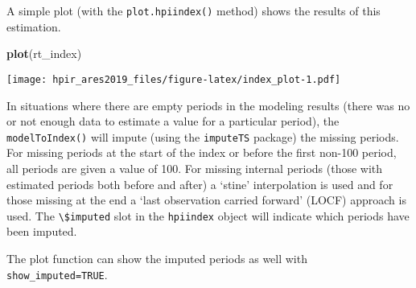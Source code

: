 \documentclass[]{article}
\newenvironment{Shaded}{\begin{snugshade}}{\end{snugshade}}
\newcommand{\DataTypeTok}[1]{\textcolor[rgb]{0.13,0.29,0.53}{#1}}
\newcommand{\DecValTok}[1]{\textcolor[rgb]{0.00,0.00,0.81}{#1}}
\newcommand{\KeywordTok}[1]{\textcolor[rgb]{0.13,0.29,0.53}{\textbf{#1}}}
\newcommand{\NormalTok}[1]{#1}
\newcommand{\OperatorTok}[1]{\textcolor[rgb]{0.81,0.36,0.00}{\textbf{#1}}}
\newcommand{\OtherTok}[1]{\textcolor[rgb]{0.56,0.35,0.01}{#1}}
\newcommand{\StringTok}[1]{\textcolor[rgb]{0.31,0.60,0.02}{#1}}
\begin{document}
A simple plot (with the \texttt{plot.hpiindex()} method) shows the
results of this estimation.

\begin{Shaded}
\begin{Highlighting}[]
  \KeywordTok{plot}\NormalTok{(rt_index)}
\end{Highlighting}
\end{Shaded}

\texttt{[image: hpir\_ares2019\_files/figure-latex/index\_plot-1.pdf]}

In situations where there are empty periods in the modeling results
(there was no or not enough data to estimate a value for a particular
period), the \texttt{modelToIndex()} will impute (using the
\texttt{imputeTS} package) the missing periods. For missing periods at
the start of the index or before the first non-100 period, all periods
are given a value of 100. For missing internal periods (those with
estimated periods both before and after) a `stine' interpolation is used
and for those missing at the end a `last observation carried forward'
(LOCF) approach is used. The \texttt{\textbackslash{}\$imputed} slot in
the \texttt{hpiindex} object will indicate which periods have been
imputed.

\begin{Shaded}
\end{Shaded}

The plot function can show the imputed periods as well with
\texttt{show\_imputed=TRUE}.
\end{document}
